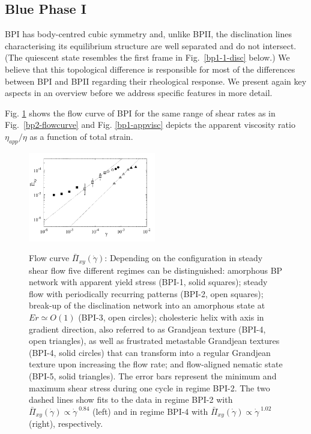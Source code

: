 \documentclass[8.5pt,twoside,twocolumn]{article}
\newcommand{\gd}{\dot{\gamma}}
\begin{document}
\subsection{Blue Phase I}

BPI has body-centred cubic symmetry and, unlike BPII, the disclination lines
characterising its equilibrium structure are well separated and do not 
intersect. (The quiescent state resembles the first frame in Fig.~\ref{bp1-1-disc}
below.)
We believe that this topological difference is responsible for most of
the differences between BPI and BPII regarding their rheological response. 
We present again key aspects in an overview before we address specific features 
in more detail. 

Fig. \ref{bp1-flowcurve} shows the flow curve of BPI for the same range of
shear rates as in Fig.~\ref{bp2-flowcurve} and Fig. \ref{bp1-appvisc} depicts 
the apparent viscosity ratio $\eta_{app}/\eta$ as a function of total strain.

\begin{figure}[htpb]
\includegraphics[width=0.495\textwidth]{flowcurve_bp1.pdf}\\
\caption{
Flow curve $\bar{\Pi}_{xy}(\gd)$: 
Depending on the configuration in steady shear flow five different regimes 
can be distinguished: amorphous BP network with apparent yield stress (BPI-1, solid squares); 
steady flow with periodically recurring patterns (BPI-2, open squares); 
break-up of the disclination network into an amorphous state at $Er\simeq O(1)$ (BPI-3, open circles);
cholesteric helix with axis in gradient direction, also referred to
as Grandjean texture (BPI-4, open triangles), as well as frustrated metastable 
Grandjean textures (BPI-4, solid circles) that can transform into 
a regular Grandjean texture upon increasing the flow rate;
and flow-aligned nematic state (BPI-5, solid triangles). 
The error bars represent the minimum and maximum shear stress 
during one cycle in regime BPI-2.
The two dashed lines show fits to the data in regime BPI-2 with 
$\bar{\Pi}_{xy}(\gd)\propto \gd^{\;0.84}$ (left) 
and in regime BPI-4 with 
$\bar{\Pi}_{xy}(\gd)\propto \gd^{\;1.02}$ (right), respectively.}
\label{bp1-flowcurve}
\end{figure}
\end{document}
